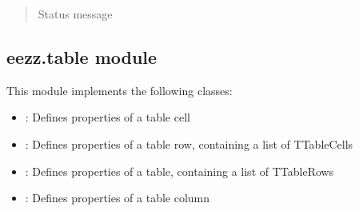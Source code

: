 \documentclass[letterpaper,10pt,english]{sphinxmanual}
\begin{document}
\begin{savenotes}
\begin{fulllineitems}
\begin{savenotes}
\begin{fulllineitems}
\begin{quote}
\begin{description}
\begin{itemize}
\end{itemize}

\sphinxAtStartPar
Status message

\end{description}\end{quote}

\end{fulllineitems}\end{savenotes}


\begin{savenotes}\begin{fulllineitems}
\label{\detokenize{eezz:eezz.session.TSession.send_bt_request}}
\pysigstartsignatures
{}
\pysigstopsignatures
\end{fulllineitems}\end{savenotes}


\end{fulllineitems}\end{savenotes}



\subsection{eezz.table module}
\label{\detokenize{eezz:module-eezz.table}}\label{\detokenize{eezz:eezz-table-module}}
\sphinxAtStartPar
This module implements the following classes:
\begin{itemize}
\item {} 
\sphinxAtStartPar
{}:   Defines properties of a table cell

\item {} 
\sphinxAtStartPar
{}:    Defines properties of a table row, containing a list of TTableCells

\item {} 
\sphinxAtStartPar
{}:       Defines properties of a table, containing a list of TTableRows

\item {} 
\sphinxAtStartPar
{}: Defines properties of a table column

\end{itemize}
\end{document}
